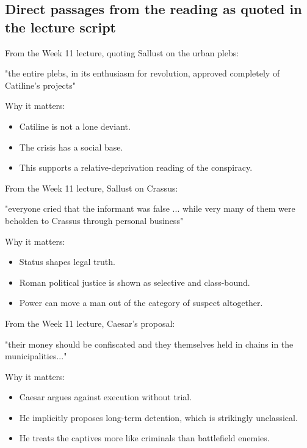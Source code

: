 \documentclass[11pt]{article}
\begin{document}
\subsection{Direct passages from the reading as quoted in the lecture script}

From the Week 11 lecture, quoting Sallust on the urban plebs:

\begin{quotebox}
"the entire plebs, in its enthusiasm for revolution, approved completely of Catiline's projects"
\end{quotebox}

Why it matters:

\begin{itemize}
\item Catiline is not a lone deviant.
\item The crisis has a social base.
\item This supports a relative-deprivation reading of the conspiracy.
\end{itemize}

From the Week 11 lecture, Sallust on Crassus:

\begin{quotebox}
"everyone cried that the informant was false ... while very many of them were beholden to Crassus through personal business"
\end{quotebox}

Why it matters:

\begin{itemize}
\item Status shapes legal truth.
\item Roman political justice is shown as selective and class-bound.
\item Power can move a man out of the category of suspect altogether.
\end{itemize}

From the Week 11 lecture, Caesar's proposal:

\begin{quotebox}
"their money should be confiscated and they themselves held in chains in the municipalities..."
\end{quotebox}

Why it matters:

\begin{itemize}
\item Caesar argues against execution without trial.
\item He implicitly proposes long-term detention, which is strikingly unclassical.
\item He treats the captives more like criminals than battlefield enemies.
\end{itemize}
\end{document}
